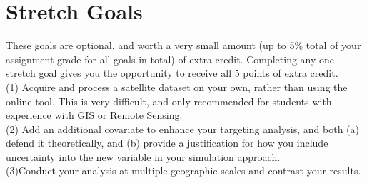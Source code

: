 \documentclass[a4paper, 11pt]{article}
\begin{document}
\section{Stretch Goals}
These goals are optional, and worth a very small amount (up to 5\% total of your assignment grade for all goals in total) of extra credit.  Completing any one stretch goal gives you the opportunity to receive all 5 points of extra credit.\\
(1) Acquire and process a satellite dataset on your own, rather than using the online tool.  This is very difficult, and only recommended for students with experience with GIS or Remote Sensing.\\
(2) Add an additional covariate to enhance your targeting analysis, and both (a) defend it theoretically, and (b) provide a justification for how you include uncertainty into the new variable in your simulation approach.\\
(3)Conduct your analysis at multiple geographic scales and contrast your results.
\end{document}
